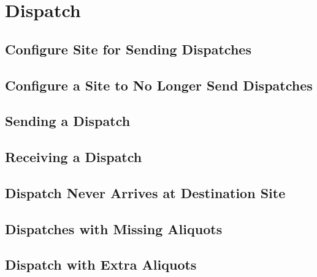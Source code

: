 \chapter{Dispatch}
\section{Configure Site for Sending Dispatches}
\section{Configure a Site to No Longer Send Dispatches}
\section{Sending a Dispatch}
\section{Receiving a Dispatch}
\section{Dispatch Never Arrives at Destination Site}
\section{Dispatches with Missing Aliquots}
\section{Dispatch with Extra Aliquots}
